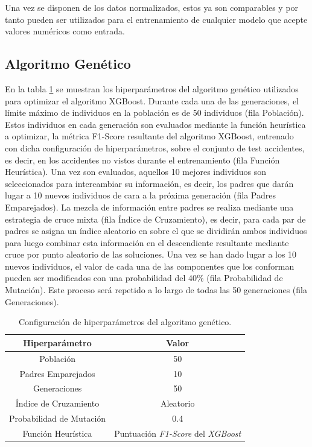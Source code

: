 Una vez se disponen de los datos normalizados, estos ya son comparables y por tanto pueden ser utilizados para el entrenamiento de cualquier modelo que acepte valores numéricos como entrada.


\subsection{Algoritmo Genético}


En la tabla \ref{GAHyperparametersSetup} se muestran los hiperparámetros del algoritmo genético utilizados para optimizar el algoritmo XGBoost. Durante cada una de las generaciones, el límite máximo de individuos en la población es de 50 individuos (fila Población). Estos individuos en cada generación son evaluados mediante la función heurística a optimizar, la métrica F1-Score resultante del algoritmo XGBoost, entrenado con dicha configuración de hiperparámetros, sobre el conjunto de test accidentes, es decir, en los accidentes no vistos durante el entrenamiento (fila Función Heurística). Una vez son evaluados, aquellos 10 mejores individuos son seleccionados para intercambiar su información, es decir, los padres que darán lugar a 10 nuevos individuos de cara a la próxima generación (fila Padres Emparejados). La mezcla de información entre padres se realiza mediante una estrategia de cruce mixta (fila Índice de Cruzamiento), es decir, para cada par de padres se asigna un índice aleatorio en sobre el que se dividirán ambos individuos para luego combinar esta información en el descendiente resultante mediante cruce por punto aleatorio de las soluciones. Una vez se han dado lugar a los 10 nuevos individuos, el valor de cada una de las componentes que los conforman pueden ser modificados con una probabilidad del 40\% (fila Probabilidad de Mutación). Este proceso será repetido a lo largo de todas las 50 generaciones (fila Generaciones).


\begin{table}[H]
	\centering
	\begin{tabular}{|c|c|}
		\hline
		\textbf{Hiperparámetro} & \textbf{Valor} \\ \hline
		\hline
		Población     & 50 \\ \hline
		Padres Emparejados & 10 \\ \hline
		Generaciones    & 50 \\ \hline
		Índice de Cruzamiento & Aleatorio \\ \hline
		Probabilidad de Mutación & 0.4 \\ \hline
		Función Heurística & Puntuación \textit{F1-Score} del \textit{XGBoost} \\ \hline \hline
	\end{tabular}
	\caption{Configuración de hiperparámetros del algoritmo genético.}
	\label{GAHyperparametersSetup}
\end{table}

